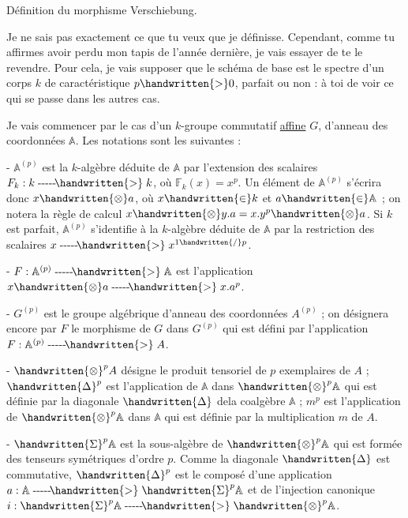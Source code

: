 
\begin{center}
Définition du morphisme Verschiebung.
\end{center}

Je ne sais pas exactement ce que tu veux que je définisse. Cependant, comme tu affirmes avoir perdu mon tapis de l'année dernière, je vais essayer de te le revendre. Pour cela, je vais supposer que le schéma de base est le spectre d'un corps $k$ de caractéristique $p\handwritten{>}0$, parfait ou non : à toi de voir ce qui se passe dans les autres cas.

Je vais commencer par le cas d'un $k$-groupe commutatif \uline{affine} $G$, d'anneau des coordonnées $\mathbb{A}$. Les notations sont les suivantes :

\noindent - $\mathbb{A}^{(p)}$ est la $k$-algèbre déduite de $\mathbb{A}$ par l'extension des scalaires $F_k:k\mathrel{\text{-{}-{}-{}-{}-}\!\handwritten{>}}k$, où $\mathbb{F}_k(x)=x^p$. Un élément de $\mathbb{A}^{(p)}$ s'écrira donc $x\handwritten{\otimes}a$, où $x\handwritten{\in}k$ et $a\handwritten{\in}\mathbb{A}$ ; on notera la règle de calcul $x\handwritten{\otimes}y.a=x.y^p\handwritten{\otimes}a$. Si $k$ est parfait, $\mathbb{A}^{(p)}$ s'identifie à la $k$-algèbre déduite de $\mathbb{A}$ par la restriction des scalaires $x\mathrel{\text{-{}-{}-{}-{}-}\!\handwritten{>}}x^{1\handwritten{/}p}$.

\noindent - $F:\mathbb{A}^{(p)}\mathrel{\text{-{}-{}-{}-{}-}\!\handwritten{>}}\mathbb{A}$ est l'application  $x\handwritten{\otimes}a\mathrel{\text{-{}-{}-{}-{}-}\!\handwritten{>}}x.a^p$.

\noindent - $G^{(p)}$ est le groupe algébrique d'anneau des coordonnées $A^{(p)}$ ; on désignera encore par $F$ le morphisme de $G$ dans $G^{(p)}$ qui est défini par l'application $F:\mathbb{A}^{(p)}\mathrel{\text{-{}-{}-{}-{}-}\!\handwritten{>}}A$.

\noindent - $\handwritten{\otimes}^{p}A$ désigne le produit tensoriel de $p$ exemplaires de $A$ ; $\handwritten{\Delta}^{p}$ est l'application de $\mathbb{A}$ dans $\handwritten{\otimes}^{p}\mathbb{A}$ qui est définie par la diagonale $\handwritten{\Delta}$ dela coalgèbre $\mathbb{A}$ ; $m^p$ est
l'application de $\handwritten{\otimes}^{p}\mathbb{A}$ dans $\mathbb{A}$ qui est définie par la multiplication $m$ de $A$.

\noindent - $\handwritten{\Sigma}^{p}\mathbb{A}$ est la sous-algèbre de $\handwritten{\otimes}^{p}\mathbb{A}$ qui est formée des tenseurs symétriques d'ordre $p$. Comme la diagonale $\handwritten{\Delta}$ est commutative, $\handwritten{\Delta}^{p}$ est le composé d'une application $a:\mathbb{A}\mathrel{\text{-{}-{}-{}-{}-}\!\handwritten{>}}\handwritten{\Sigma}^{p}\mathbb{A}$ et de l'injection canonique $i:\handwritten{\Sigma}^{p}\mathbb{A}\mathrel{\text{-{}-{}-{}-{}-}\!\handwritten{>}}\handwritten{\otimes}^{p}\mathbb{A}$.

